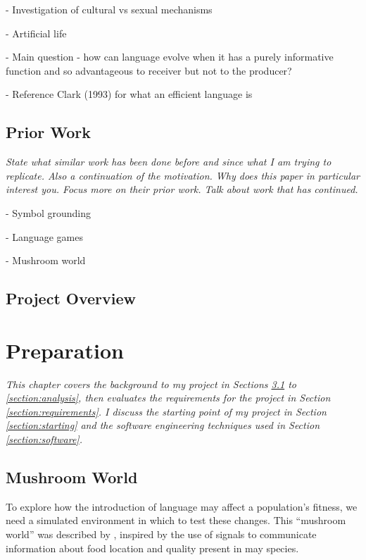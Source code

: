 \documentclass[12pt,a4paper,twoside,openright]{report}
\begin{document}
- Investigation of cultural vs sexual mechanisms

- Artificial life

- Main question - how can language evolve when it has a purely informative function and so advantageous to receiver but not to the producer?

- Reference Clark (1993) for what an efficient language is

\section{Prior Work}

\emph{State what similar work has been done before and since what I am trying to replicate. Also a continuation of the motivation. Why does this paper in particular interest you. Focus more on their prior work. Talk about work that has continued.}

- Symbol grounding

- Language games

- Mushroom world

\section{Project Overview}


\chapter{Preparation}\label{chapter:preparation}

\emph{This chapter covers the background to my project in Sections \ref{section:world} to \ref{section:analysis}, then evaluates the requirements for the project in Section \ref{section:requirements}. I discuss the starting point of my project in Section \ref{section:starting} and the software engineering techniques used in Section \ref{section:software}.}

\section{Mushroom World}\label{section:world}

To explore how the introduction of language may affect a population's fitness, we need a simulated environment in which to test these changes. This ``mushroom world'' was described by \cite{Cangelosi1998}, inspired by the use of signals to communicate information about food location and quality present in may species.
\end{document}
